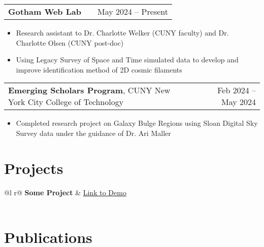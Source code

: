 \documentclass[a4paper,12pt]{article}
\makeatletter
\newenvironment{joblong}[2]
    {
    \begin{tabularx}{\linewidth}{@{}l X r@{}}
    #1 & \hfill &  #2 \\[3.75pt]
    \end{tabularx}
    \begin{minipage}[t]{\linewidth}
    \begin{itemize}[nosep,after=\strut, leftmargin=1em, itemsep=3pt,label=--]
    }
    {
    \end{itemize}
    \end{minipage}    
    }
\makeatother
\begin{document}
\begin{joblong}{\textbf{Gotham Web Lab}}{May 2024 -- Present}
\item Research assistant to Dr. Charlotte Welker (CUNY faculty) and Dr. Charlotte Olsen (CUNY post-doc)
\item Using Legacy Survey of Space and Time simulated data to develop and improve identification method of 2D cosmic filaments 
\end{joblong}

\begin{joblong}{\textbf{Emerging Scholars Program}, CUNY New York City College of Technology}{Feb 2024 -- May 2024}
\item Completed research project on Galaxy Bulge Regions using Sloan Digital Sky Survey data under the guidance of Dr. Ari Maller 
\end{joblong}
  
\section{Projects}

\begin{tabularx}{\linewidth}{ @{}l r@{} }
\textbf{Some Project} & \hfill \href{https://some-link.com}{Link to Demo} \\[3.75pt]
  \\
\end{tabularx}

\section{Publications}
\begin{refsection}
\nocite{*}
\printbibliography[heading=none]
\end{refsection}

\end{document}
